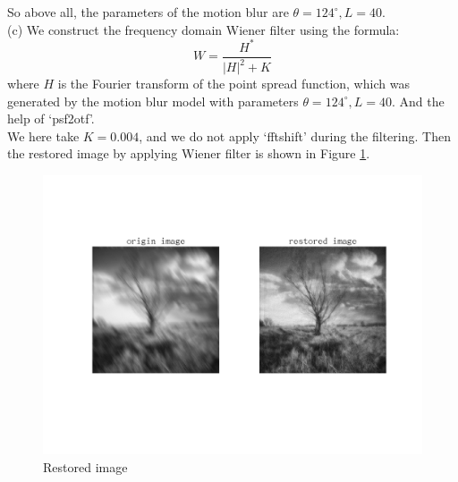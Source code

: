 So above all, the parameters of the motion blur are $\theta=124^{\circ},L=40$.\\

(c)
We construct the frequency domain Wiener filter using the formula:
$$W = \dfrac{H^*}{|H|^2+K}$$
where $H$ is the Fourier transform of the point spread function, which was generated by the motion blur model with parameters $\theta=124^{\circ},L=40$. And the help of `psf2otf'.\\ 
We here take $K=0.004$, and we do not apply `fftshift' during the filtering.
Then the restored image by applying Wiener filter is shown in Figure \ref{fig:p4c}.\\
\begin{figure}[htbp]
    \centering
	\includegraphics[width=\textwidth]{../images/p4/p4c.png}
    \caption{Restored image}
    \label{fig:p4c}
\end{figure}